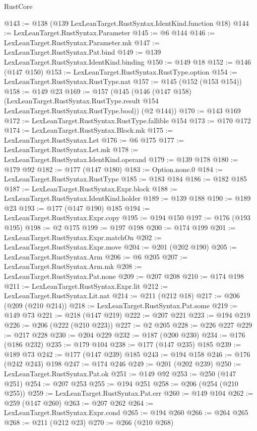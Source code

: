 \begin{lexlean}{RustCore}
\begin{coremodule}
{\begin{coremodule}
{{{{{@143 := @138 (@139 LexLeanTarget.RustSyntax.IdentKind.function @18)
@144 := LexLeanTarget.RustSyntax.Parameter
@145 := @6 @144
@146 := LexLeanTarget.RustSyntax.Parameter.mk
@147 := LexLeanTarget.RustSyntax.Pat.bind
@149 := @139 LexLeanTarget.RustSyntax.IdentKind.binding
@150 := @149 @18
@152 := @146 (@147 @150)
@153 := LexLeanTarget.RustSyntax.RustType.option
@154 := LexLeanTarget.RustSyntax.RustType.nat
@157 := @145 (@152 (@153 @154))
@158 := @149 @23
@169 := @157
    (@145
      (@146
        (@147 @158)
        (LexLeanTarget.RustSyntax.RustType.result @154 LexLeanTarget.RustSyntax.RustType.bool))
      (@2 @144))
@170 := @143 @169
@172 := LexLeanTarget.RustSyntax.RustType.fallible @154
@173 := @170 @172
@174 := LexLeanTarget.RustSyntax.Block.mk
@175 := LexLeanTarget.RustSyntax.Let
@176 := @6 @175
@177 := LexLeanTarget.RustSyntax.Let.mk
@178 := LexLeanTarget.RustSyntax.IdentKind.operand
@179 := @139 @178
@180 := @179 @92
@182 := @177 (@147 @180)
@183 := Option.none.{0}
@184 := LexLeanTarget.RustSyntax.RustType
@185 := @183 @184
@186 := @182 @185
@187 := LexLeanTarget.RustSyntax.Expr.block
@188 := LexLeanTarget.RustSyntax.IdentKind.holder
@189 := @139 @188
@190 := @189 @23
@193 := @177 (@147 @190) @185
@194 := LexLeanTarget.RustSyntax.Expr.copy
@195 := @194 @150
@197 := @176 (@193 @195)
@198 := @2 @175
@199 := @197 @198
@200 := @174 @199
@201 := LexLeanTarget.RustSyntax.Expr.matchOn
@202 := LexLeanTarget.RustSyntax.Expr.move
@204 := @201 (@202 @190)
@205 := LexLeanTarget.RustSyntax.Arm
@206 := @6 @205
@207 := LexLeanTarget.RustSyntax.Arm.mk
@208 := LexLeanTarget.RustSyntax.Pat.none
@209 := @207 @208
@210 := @174 @198
@211 := LexLeanTarget.RustSyntax.Expr.lit
@212 := LexLeanTarget.RustSyntax.Lit.nat
@214 := @211 (@212 @18)
@217 := @206 (@209 (@210 @214))
@218 := LexLeanTarget.RustSyntax.Pat.some
@219 := @149 @73
@221 := @218 (@147 @219)
@222 := @207 @221
@223 := @194 @219
@226 := @206 (@222 (@210 @223))
@227 := @2 @205
@228 := @226 @227
@229 := @217 @228
@230 := @204 @229
@232 := @187 (@200 @230)
@234 := @176 (@186 @232)
@235 := @179 @104
@238 := @177 (@147 @235) @185
@239 := @189 @73
@242 := @177 (@147 @239) @185
@243 := @194 @158
@246 := @176 (@242 @243) @198
@247 := @174 @246
@249 := @201 (@202 @239)
@250 := LexLeanTarget.RustSyntax.Pat.ok
@251 := @149 @92
@253 := @250 (@147 @251)
@254 := @207 @253
@255 := @194 @251
@258 := @206 (@254 (@210 @255))
@259 := LexLeanTarget.RustSyntax.Pat.err
@260 := @149 @104
@262 := @259 (@147 @260)
@263 := @207 @262
@264 := LexLeanTarget.RustSyntax.Expr.cond
@265 := @194 @260
@266 := @264 @265
@268 := @211 (@212 @23)
@270 := @266 (@210 @268)
}}}}}
\end{coremodule}}
\end{coremodule}
\end{lexlean}
